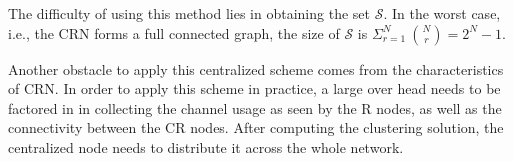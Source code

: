 \documentclass[10pt,journal,compsoc]{IEEEtran}
\theoremstyle{mytheoremstyle}
\theoremstyle{mytheoremstyle}
\theoremstyle{mytheoremstyle}
\newcommand{\ie}{i.e., }
\begin{document}






The difficulty of using this method lies in obtaining the set $\mathcal{S}$.
In the worst case, \ie the CRN forms a full connected graph, the size of $\mathcal{S}$ is $\Sigma_{r=1}^{N}\ {N \choose r} = 2^N-1$.

Another obstacle to apply this centralized scheme comes from the characteristics of CRN.
In order to apply this scheme in practice, a large over head needs to be factored in in collecting the channel usage as seen by the R nodes, as well as the connectivity between the CR nodes.
After computing the clustering solution, the centralized node needs to distribute it across the whole network.
\end{document}
